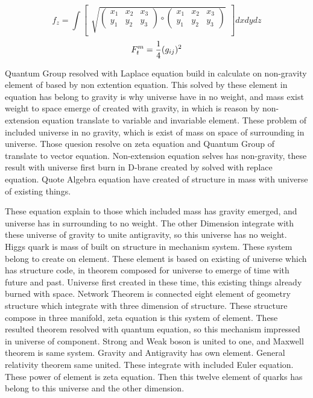 \documentclass{jsarticle}
\begin{document}
   $$ f_{z} = \int \begin{bmatrix} \sqrt{\begin{pmatrix} x_{1} & x_{2} & x_{3} \\
  y_{1} & y_{2} & y_{3} \end{pmatrix}
     \circ
   \begin{pmatrix} x_{1} & x_{2} & x_{3} \\
  y_{1} & y_{2} & y_{3} \end{pmatrix}}_{}
     \end{bmatrix}dxdydz $$
 $$ F^m_{t} = {1 \over 4}(g_{ij})^2 $$


  Quantum Group resolved with Laplace equation build in calculate on non-gravity element of based by non extention
equation. This solved by these element in equation has belong to gravity is why universe have in no weight,
and mass exist weight to space emerge of created with gravity, in which is reason by non-extension equation 
translate to variable and invariable element. These problem of included universe in no gravity, which is exist of mass
on space of surrounding in universe. Those quesion resolve on zeta equation and Quantum Group of translate to vector
equation. Non-extension equation selves has non-gravity, these result with universe first burn in D-brane created by 
solved with replace equation. Quote Algebra equation have created of structure in mass with universe of existing 
things.

  These equation explain to those which included mass has gravity emerged, and universe has in surrounding to no
weight. The other Dimension integrate with these universe of gravity to unite antigravity, so this universe has no
weight. Higgs quark is mass of built on structure in mechanism system. These system belong to create on element.
These element is based on existing of universe which has structure code, in theorem composed for universe to emerge
of time with future and past. Universe first created in these time, this existing things already burned with space.
Network Theorem is connected eight element of geometry structure which integrate with three dimension of structure.
These structure compose in three manifold, zeta equation is this system of element. These resulted theorem resolved
with quantum equation, so this mechanism impressed in universe of component. Strong and Weak boson is united to one,
and Maxwell theorem is same system. Gravity and Antigravity has own element. General relativity theorem same united.
These integrate with included Euler equation. These power of element is zeta equation. Then this twelve element of
quarks has belong to this universe and the other dimension.
\end{document}
